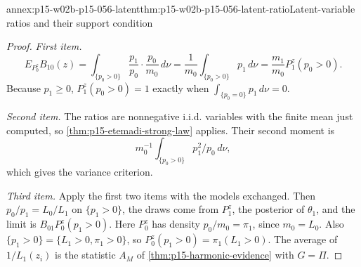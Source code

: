 \begin{annexitem}{annex:p15-w02b-p15-056-latent}{thm:p15-w02b-p15-056-latent-ratio}{Latent-variable ratios and their support condition}
\begin{proof}
\emph{First item.}
\[
 E_{P^z_0}B_{10}(z)=\int_{\{p_0>0\}}\frac{p_1}{p_0}\cdot\frac{p_0}{m_0}\,d\nu
 =\frac1{m_0}\int_{\{p_0>0\}}p_1\,d\nu=\frac{m_1}{m_0}P^z_1(p_0>0).
\]
Because \(p_1\geq0\), \(P^z_1(p_0>0)=1\) exactly when
\(\int_{\{p_0=0\}}p_1\,d\nu=0\).

\emph{Second item.} The ratios are nonnegative i.i.d. variables with the
finite mean just computed, so \cref{thm:p15-etemadi-strong-law} applies.
Their second moment is
\[
 m_0^{-1}\int_{\{p_0>0\}}p_1^2/p_0\,d\nu,
\]
which gives the variance criterion.

\emph{Third item.} Apply the first two items with the models
exchanged. Then \(p_0/p_1=L_0/L_1\) on \(\{p_1>0\}\), the draws come from
\(P^z_1\), the posterior of \(\theta_1\), and the limit is
\(B_{01}P^z_0(p_1>0)\). Here \(P^z_0\) has density \(p_0/m_0=\pi_1\),
since \(m_0=L_0\). Also \(\{p_1>0\}=\{L_1>0,\pi_1>0\}\), so
\(P^z_0(p_1>0)=\pi_1(L_1>0)\). The average of \(1/L_1(z_i)\) is the
statistic \(A_M\) of \cref{thm:p15-harmonic-evidence} with \(G=\Pi\).
\end{proof}
\end{annexitem}

